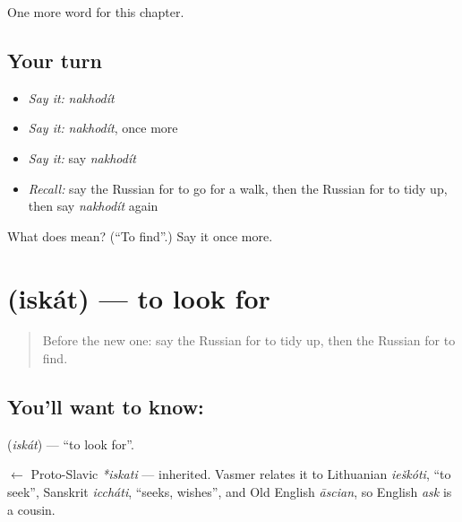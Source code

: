 \begin{grammarlens}[title={What you've built}]
One more word for this chapter.
\end{grammarlens}

\subsection*{Your turn}
\begin{itemize}
\raggedright
  \item \emph{Say it:} \emph{nakhodít}
  \item \emph{Say it:} \emph{nakhodít}, once more
  \item \emph{Say it:} say \emph{nakhodít}
  \item \emph{Recall:} say the Russian for to go for a walk, then the Russian for to tidy up, then say \emph{nakhodít} again
\end{itemize}

\begin{tcolorbox}[breakable,colback=teal!4,colframe=teal!35!black,title={Before you move on}]
What does  mean? (\textquotedblleft{}To find\textquotedblright{}.) Say it once more.
\end{tcolorbox}
\section[\texorpdfstring{\ru{искать} (iskát)}{искать (iskát)}]{ (iskát) — to look for}

\label{lesson:RU-C134-to-look-for}



\begin{quote}
Before the new one: say the Russian for to tidy up, then the Russian for to find.
\end{quote}

\subsection*{You'll want to know: }
\textbf{} (\emph{iskát}) — \textquotedblleft{}to look for\textquotedblright{}.

\begin{cousinweb}
\textbf{} $\leftarrow$ Proto-Slavic \emph{*iskati} — inherited. Vasmer relates it to Lithuanian \emph{ieškóti}, \textquotedblleft{}to seek\textquotedblright{}, Sanskrit \emph{iccháti}, \textquotedblleft{}seeks, wishes\textquotedblright{}, and Old English \emph{āscian}, so English \emph{ask} is a cousin.
\end{cousinweb}

